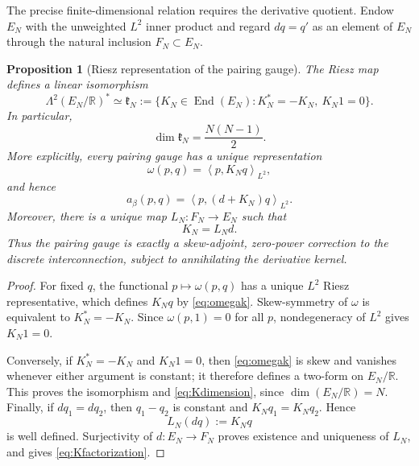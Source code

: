 \documentclass[11pt,a4paper]{article}
\newtheorem{proposition}[theorem]{Proposition}
\theoremstyle{definition}
\theoremstyle{remark}
\newcommand{\R}{\mathbb{R}}
\newcommand{\pair}[2]{\left\langle #1,#2\right\rangle}
\begin{document}
The precise finite-dimensional relation requires the derivative quotient.  Endow $E_N$ with
the unweighted $L^2$ inner product and regard $dq=q'$ as an element of $E_N$ through the
natural inclusion $F_N\subset E_N$.

\begin{proposition}[Riesz representation of the pairing gauge]\label{prop:relativepzero}
The Riesz map defines a linear isomorphism
\begin{equation}\label{eq:Kspace}
 \Lambda^2(E_N/\R)^*
 \simeq
 \mathfrak k_N
 :=\{K_N\in\operatorname{End}(E_N):K_N^*=-K_N,\ K_N1=0\}.
\end{equation}
In particular,
\begin{equation}\label{eq:Kdimension}
 \dim\mathfrak k_N=\frac{N(N-1)}2.
\end{equation}
More explicitly, every pairing gauge has a unique representation
\begin{equation}\label{eq:omegak}
 \omega(p,q)=\pair{p}{K_Nq}_{L^2},
\end{equation}
and hence
\begin{equation}\label{eq:operatorgauge}
 a_\beta(p,q)
 =\pair{p}{(d+K_N)q}_{L^2}.
\end{equation}
Moreover, there is a unique map $L_N:F_N\to E_N$ such that
\begin{equation}\label{eq:Kfactorization}
 \boxed{K_N=L_Nd.}
\end{equation}
Thus the pairing gauge is exactly a skew-adjoint, zero-power correction to the discrete
interconnection, subject to annihilating the derivative kernel.
\end{proposition}

\begin{proof}
For fixed $q$, the functional $p\mapsto\omega(p,q)$ has a unique $L^2$ Riesz representative,
which defines $K_Nq$ by \eqref{eq:omegak}.  Skew-symmetry of $\omega$ is equivalent to
$K_N^*=-K_N$.  Since $\omega(p,1)=0$ for all $p$, nondegeneracy of $L^2$ gives $K_N1=0$.

Conversely, if $K_N^*=-K_N$ and $K_N1=0$, then \eqref{eq:omegak} is skew and vanishes
whenever either argument is constant; it therefore defines a two-form on $E_N/\R$.  This
proves the isomorphism and \eqref{eq:Kdimension}, since $\dim(E_N/\R)=N$.  Finally, if
$dq_1=dq_2$, then $q_1-q_2$ is constant and
$K_Nq_1=K_Nq_2$.  Hence
\[
 L_N(dq):=K_Nq
\]
is well defined.  Surjectivity of $d:E_N\to F_N$ proves existence and uniqueness of $L_N$,
and gives \eqref{eq:Kfactorization}.
\end{proof}
\end{document}
